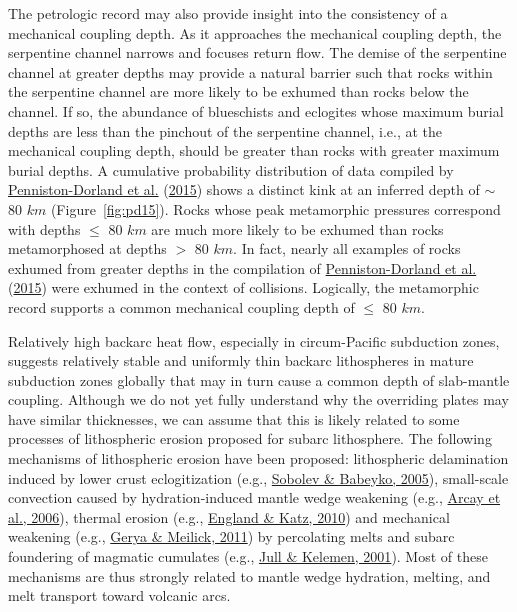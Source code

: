 \documentclass[draft,linenumbers]{agujournal2018}
\begin{document}
The petrologic record may also provide insight into the consistency of a
mechanical coupling depth. As it approaches the mechanical coupling
depth, the serpentine channel narrows and focuses return flow. The
demise of the serpentine channel at greater depths may provide a natural
barrier such that rocks within the serpentine channel are more likely to
be exhumed than rocks below the channel. If so, the abundance of
blueschists and eclogites whose maximum burial depths are less than the
pinchout of the serpentine channel, i.e., at the mechanical coupling
depth, should be greater than rocks with greater maximum burial depths.
A cumulative probability distribution of data compiled by
\protect\hyperlink{ref-Penniston2015}{Penniston-Dorland et al.}
(\protect\hyperlink{ref-Penniston2015}{2015}) shows a distinct kink at
an inferred depth of \(\sim\) 80 \(km\) (Figure~\ref{fig:pd15}). Rocks
whose peak metamorphic pressures correspond with depths \(\leq\) 80
\(km\) are much more likely to be exhumed than rocks metamorphosed at
depths \(>\) 80 \(km\). In fact, nearly all examples of rocks exhumed
from greater depths in the compilation of
\protect\hyperlink{ref-Penniston2015}{Penniston-Dorland et al.}
(\protect\hyperlink{ref-Penniston2015}{2015}) were exhumed in the
context of collisions. Logically, the metamorphic record supports a
common mechanical coupling depth of \(\leq\) 80 \(km\).

Relatively high backarc heat flow, especially in circum-Pacific
subduction zones, suggests relatively stable and uniformly thin backarc
lithospheres in mature subduction zones globally that may in turn cause
a common depth of slab-mantle coupling. Although we do not yet fully
understand why the overriding plates may have similar thicknesses, we
can assume that this is likely related to some processes of lithospheric
erosion proposed for subarc lithosphere. The following mechanisms of
lithospheric erosion have been proposed: lithospheric delamination
induced by lower crust eclogitization (e.g.,
\protect\hyperlink{ref-Sobolev2005}{Sobolev \& Babeyko, 2005}),
small-scale convection caused by hydration-induced mantle wedge
weakening (e.g., \protect\hyperlink{ref-Arcay2006}{Arcay et al., 2006}),
thermal erosion (e.g., \protect\hyperlink{ref-England2010}{England \&
Katz, 2010}) and mechanical weakening (e.g.,
\protect\hyperlink{ref-Gerya2011}{Gerya \& Meilick, 2011}) by
percolating melts and subarc foundering of magmatic cumulates (e.g.,
\protect\hyperlink{ref-Jull2001}{Jull \& Kelemen, 2001}). Most of these
mechanisms are thus strongly related to mantle wedge hydration, melting,
and melt transport toward volcanic arcs.
\end{document}
